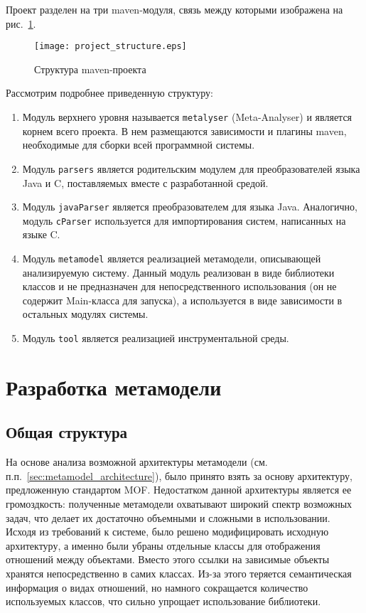 Проект разделен на три maven-модуля, связь между которыми изображена на
рис.~\ref{fig:project_structure}.

\begin{figure}[ht]
    \begin{center}
        \texttt{[image: project\_structure.eps]}
    \end{center}
    \caption{Структура maven-проекта}
    \label{fig:project_structure}
\end{figure}

Рассмотрим подробнее приведенную структуру:

\begin{enumerate}
    \item Модуль верхнего уровня называется \texttt{metalyser} (Meta-Analyser) и
    является корнем всего проекта. В нем размещаются зависимости и плагины maven,
    необходимые для сборки всей программной системы.
    \item Модуль \texttt{parsers} является родительским модулем для
    преобразователей языка Java и C, поставляемых вместе с разработанной средой.
    \item Модуль \texttt{javaParser} является преобразователем для языка Java.
    Аналогично, модуль \texttt{cParser} используется для импортирования систем,
    написанных на языке C.
    \item Модуль \texttt{metamodel} является реализацией метамодели,
    описывающей анализируемую систему. Данный модуль реализован в виде
    библиотеки классов и не предназначен для непосредственного использования
    (он не содержит Main-класса для запуска), а используется в виде зависимости
    в остальных модулях системы.
    \item Модуль \texttt{tool} является реализацией инструментальной среды.
\end{enumerate}

\section{Разработка метамодели}
\subsection{Общая структура}

На основе анализа возможной архитектуры метамодели (см.
п.п.~\ref{sec:metamodel_architecture}), было принято взять за основу
архитектуру, предложенную стандартом MOF. Недостатком данной архитектуры
является ее громоздкость: полученные метамодели охватывают широкий спектр
возможных задач, что делает их достаточно объемными и сложными в использовании.
Исходя из требований к системе, было решено модифицировать исходную архитектуру,
а именно были убраны отдельные классы для отображения отношений между объектами.
Вместо этого ссылки на зависимые объекты хранятся непосредственно в самих
классах. Из-за этого теряется семантическая информация о видах отношений, но
намного сокращается количество используемых классов, что сильно упрощает
использование библиотеки.

